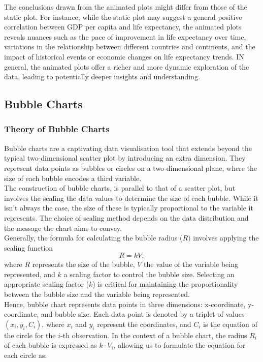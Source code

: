 \documentclass{article}\usepackage[]{graphicx}\usepackage[]{xcolor}
\numberwithin{equation}{section}
\begin{document}
\noindent The conclusions drawn from the animated plots might differ from those of the static plot. For instance, while the static plot may suggest a general positive correlation between GDP per capita and life expectancy, the animated plots reveals nuances such as the pace of improvement in life expectancy over time, variations in the relationship between different countries and continents, and the impact of historical events or economic changes on life expectancy trends. IN general, the animated plots offer a richer and more dynamic exploration of the data, leading to potentially deeper insights and understanding.

\subsection{Bubble Charts}
\subsubsection{Theory of Bubble Charts}
\noindent Bubble charts are a captivating data visualisation tool that extends beyond the typical two-dimensional scatter plot by introducing an extra dimension. They represent data points as bubbles or circles on a two-dimensional plane, where the size of each bubble encodes a third variable.\\

\noindent The construction of bubble charts, is parallel to that of a scatter plot, but involves the scaling the data values to determine the size of each bubble. While it isn't always the case, the size of these is typically proportional to the variable it represents. The choice of scaling method depends on the data distribution and the message the chart aims to convey.\\

\noindent Generally, the formula for calculating the bubble radius (\(R)\) involves applying the scaling function
\[
R = kV,
\]
\noindent where \(R\) represents the size of the bubble, \(V\) the value of the variable being represented, and \(k\) a scaling factor to control the bubble size. Selecting an appropriate scaling factor (\(k\)) is critical for maintaining the proportionality between the bubble size and the variable being represented.\\ 

\noindent Hence, bubble chart represents data points in three dimensions: x-coordinate, y-coordinate, and bubble size. Each data point is denoted by a triplet of values \((x_i, y_i, C_i)\), where \(x_i\) and \(y_i\) represent the coordinates, and \(C_i\) is the equation of the circle for the \(i\)-th observation. In the context of a bubble chart, the radius \(R_i\) of each bubble is expressed as \(k \cdot V_i\), allowing us to formulate the equation for each circle as:
\end{document}
